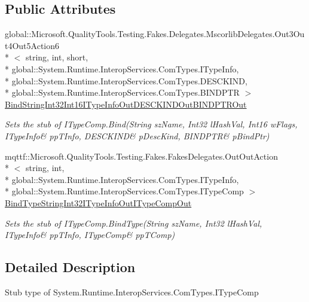 \subsection*{Public Attributes}
\begin{DoxyCompactItemize}
\item 
global\-::\-Microsoft.\-Quality\-Tools.\-Testing.\-Fakes.\-Delegates.\-Mscorlib\-Delegates.\-Out3\-Out4\-Out5\-Action6\\*
$<$ string, int, short, \\*
global\-::\-System.\-Runtime.\-Interop\-Services.\-Com\-Types.\-I\-Type\-Info, \\*
global\-::\-System.\-Runtime.\-Interop\-Services.\-Com\-Types.\-D\-E\-S\-C\-K\-I\-N\-D, \\*
global\-::\-System.\-Runtime.\-Interop\-Services.\-Com\-Types.\-B\-I\-N\-D\-P\-T\-R $>$ \hyperlink{class_system_1_1_runtime_1_1_interop_services_1_1_com_types_1_1_fakes_1_1_stub_i_type_comp_af68608d4ae61f7198360a560ca0f55eb}{Bind\-String\-Int32\-Int16\-I\-Type\-Info\-Out\-D\-E\-S\-C\-K\-I\-N\-D\-Out\-B\-I\-N\-D\-P\-T\-R\-Out}
\begin{DoxyCompactList}\small\item\em Sets the stub of I\-Type\-Comp.\-Bind(String sz\-Name, Int32 l\-Hash\-Val, Int16 w\-Flags, I\-Type\-Info\& pp\-T\-Info, D\-E\-S\-C\-K\-I\-N\-D\& p\-Desc\-Kind, B\-I\-N\-D\-P\-T\-R\& p\-Bind\-Ptr)\end{DoxyCompactList}\item 
mqttf\-::\-Microsoft.\-Quality\-Tools.\-Testing.\-Fakes.\-Fakes\-Delegates.\-Out\-Out\-Action\\*
$<$ string, int, \\*
global\-::\-System.\-Runtime.\-Interop\-Services.\-Com\-Types.\-I\-Type\-Info, \\*
global\-::\-System.\-Runtime.\-Interop\-Services.\-Com\-Types.\-I\-Type\-Comp $>$ \hyperlink{class_system_1_1_runtime_1_1_interop_services_1_1_com_types_1_1_fakes_1_1_stub_i_type_comp_a25ed2c42aed624d8638df8b3bacfb0ca}{Bind\-Type\-String\-Int32\-I\-Type\-Info\-Out\-I\-Type\-Comp\-Out}
\begin{DoxyCompactList}\small\item\em Sets the stub of I\-Type\-Comp.\-Bind\-Type(String sz\-Name, Int32 l\-Hash\-Val, I\-Type\-Info\& pp\-T\-Info, I\-Type\-Comp\& pp\-T\-Comp)\end{DoxyCompactList}\end{DoxyCompactItemize}


\subsection{Detailed Description}
Stub type of System.\-Runtime.\-Interop\-Services.\-Com\-Types.\-I\-Type\-Comp



